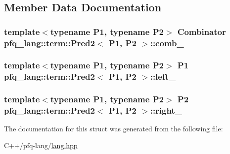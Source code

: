 \subsection{Member Data Documentation}
\hypertarget{structpfq__lang_1_1term_1_1Pred2_a6b0db7f4e7c69fef8112e5b9a65e2af9}{
\subsubsection[{comb\-\_\-}]{\setlength{\rightskip}{0pt plus 5cm}template$<$typename P1, typename P2$>$ {\bf Combinator} {\bf pfq\-\_\-lang\-::term\-::\-Pred2}$<$ P1, P2 $>$\-::comb\-\_\-}}\label{structpfq__lang_1_1term_1_1Pred2_a6b0db7f4e7c69fef8112e5b9a65e2af9}
\hypertarget{structpfq__lang_1_1term_1_1Pred2_accc6c58f733abc7027ffde56148dd91e}{
\subsubsection[{left\-\_\-}]{\setlength{\rightskip}{0pt plus 5cm}template$<$typename P1, typename P2$>$ P1 {\bf pfq\-\_\-lang\-::term\-::\-Pred2}$<$ P1, P2 $>$\-::left\-\_\-}}\label{structpfq__lang_1_1term_1_1Pred2_accc6c58f733abc7027ffde56148dd91e}
\hypertarget{structpfq__lang_1_1term_1_1Pred2_a0bc158e2c177545dcc9199caab6a4d12}{
\subsubsection[{right\-\_\-}]{\setlength{\rightskip}{0pt plus 5cm}template$<$typename P1, typename P2$>$ P2 {\bf pfq\-\_\-lang\-::term\-::\-Pred2}$<$ P1, P2 $>$\-::right\-\_\-}}\label{structpfq__lang_1_1term_1_1Pred2_a0bc158e2c177545dcc9199caab6a4d12}


The documentation for this struct was generated from the following file\-:\begin{DoxyCompactItemize}
\item 
C++/pfq-\/lang/\hyperlink{lang_8hpp}{lang.\-hpp}\end{DoxyCompactItemize}
